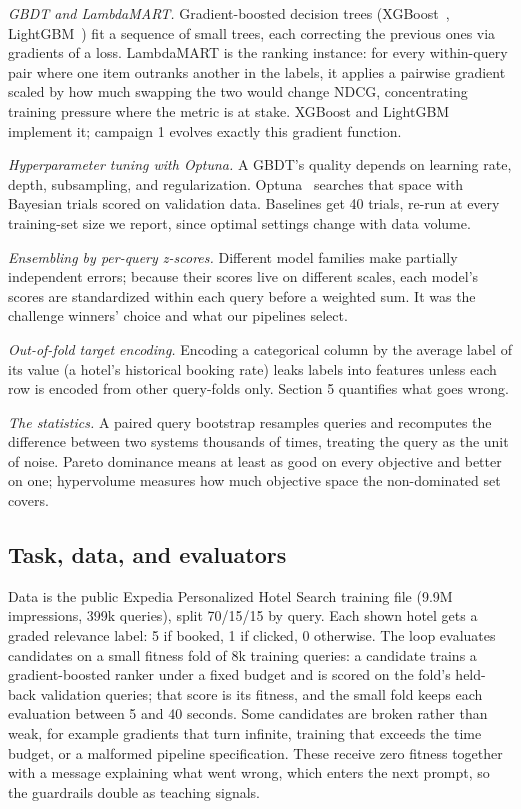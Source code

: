 \documentclass[]{ceurart}
\begin{document}
\emph{GBDT and LambdaMART.} Gradient-boosted decision trees
(XGBoost~\cite{xgboost}, LightGBM~\cite{lightgbm}) fit a sequence of small trees, each correcting the previous ones via
gradients of a loss. LambdaMART is the ranking instance:
for every within-query pair where one item outranks another in the
labels, it applies a pairwise gradient scaled by how much swapping the two
would change NDCG, concentrating training pressure where the metric is at
stake. XGBoost and LightGBM implement it; campaign 1 evolves exactly this
gradient function.

\emph{Hyperparameter tuning with Optuna.} A GBDT's quality depends on
learning rate, depth, subsampling, and regularization. Optuna~\cite{optuna}
searches that space with Bayesian trials scored on validation data. Baselines get 40 trials, re-run at every training-set size we report,
since optimal settings change with data volume.

\emph{Ensembling by per-query z-scores.} Different model families make
partially independent errors; because their scores live on different scales,
each model's scores are standardized within each query before a weighted
sum. It was the challenge winners' choice and what our pipelines select.

\emph{Out-of-fold target encoding.} Encoding a categorical column by the average label of its value (a
hotel's historical booking rate) leaks labels into features unless each row
is encoded from other query-folds only. Section 5 quantifies what goes
wrong.

\emph{The statistics.} A paired query bootstrap resamples queries and recomputes the difference
between two systems thousands of times, treating the query as the unit of
noise. Pareto dominance
means at least as good on every objective and better on one; hypervolume
measures how much objective space the non-dominated set covers.

\subsection{Task, data, and evaluators}
Data is the public Expedia Personalized Hotel Search training file (9.9M
impressions, 399k queries), split 70/15/15 by query. Each shown hotel gets a
graded relevance label: 5 if booked, 1 if clicked, 0 otherwise. The loop
evaluates candidates on a small fitness fold of 8k training queries: a candidate trains a gradient-boosted ranker under a fixed budget and is
scored on the fold's held-back validation queries; that score is its
fitness, and the small fold keeps each evaluation between 5 and 40 seconds. Some
candidates are broken rather than weak, for example gradients that turn
infinite, training that exceeds the time budget, or a malformed pipeline
specification. These receive zero fitness together with a message explaining
what went wrong, which enters the next prompt, so the guardrails double as
teaching signals.
\end{document}

